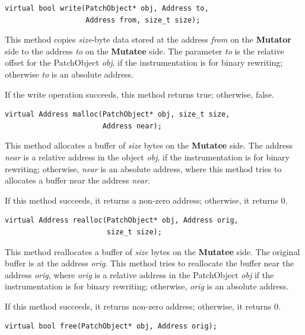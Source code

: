 \documentclass[11pt]{article}
\begin{document}
\begin{verbatim}
virtual bool write(PatchObject* obj, Address to,
                   Address from, size_t size);

\end{verbatim}



This method copies \emph{size}-byte data stored at the address \emph{from} on the
\textbf{Mutator} side to the address \emph{to} on the \textbf{Mutatee} side. The parameter \emph{to} is
the relative offset for the PatchObject \emph{obj}, if the instrumentation is for
binary rewriting; otherwise \emph{to} is an absolute address.

If the write operation succeeds, this method returns true; otherwise, false.


\begin{verbatim}
virtual Address malloc(PatchObject* obj, size_t size,
                       Address near);

\end{verbatim}



This method allocates a buffer of \emph{size} bytes on the \textbf{Mutatee} side. The
address \emph{near} is a relative address in the object \emph{obj}, if the instrumentation
is for binary rewriting; otherwise, \emph{near} is an absolute address, where this
method tries to allocates a buffer near the address \emph{near}.

If this method succeeds, it returns a non-zero address; otherwise, it returns 0.


\begin{verbatim}
virtual Address realloc(PatchObject* obj, Address orig,
                        size_t size);

\end{verbatim}



This method reallocates a buffer of \emph{size} bytes on the \textbf{Mutatee} side. The
original buffer is at the address \emph{orig}. This method tries to reallocate the
buffer near the address \emph{orig}, where \emph{orig} is a relative address in the
PatchObject \emph{obj} if the instrumentation is for binary rewriting; otherwise,
\emph{orig} is an absolute address.

If this method succeeds, it returns non-zero address; otherwise, it returns 0.


\begin{verbatim}
virtual bool free(PatchObject* obj, Address orig);

\end{verbatim}
\end{document}
